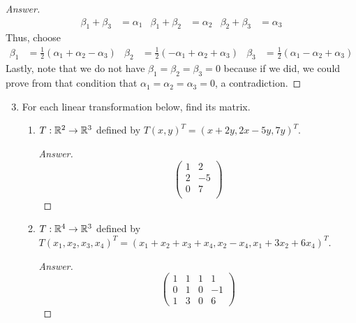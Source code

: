 \documentclass[../psets.tex]{subfiles}
\begin{document}
\begin{enumerate}[label={\textbf{2.\arabic*.}}]
\begin{proof}[Answer]
\begin{align*}
            \beta_1+\beta_3 &= \alpha_1&
            \beta_1+\beta_2 &= \alpha_2&
            \beta_2+\beta_3 &= \alpha_3
        \end{align*}
        Thus, choose
        \begin{align*}
            \beta_1 &= \frac{1}{2}(\alpha_1+\alpha_2-\alpha_3)&
            \beta_2 &= \frac{1}{2}(-\alpha_1+\alpha_2+\alpha_3)&
            \beta_3 &= \frac{1}{2}(\alpha_1-\alpha_2+\alpha_3)
        \end{align*}
        Lastly, note that we do not have $\beta_1=\beta_2=\beta_3=0$ because if we did, we could prove from that condition that $\alpha_1=\alpha_2=\alpha_3=0$, a contradiction.
    \end{proof}
\end{enumerate}

\begin{enumerate}[label={\textbf{3.\arabic*.}}]
    \setcounter{enumi}{2}
    \item For each linear transformation below, find its matrix.
    \begin{enumerate}
        \item $T:\mathbb{R}^2\to\mathbb{R}^3$ defined by $T(x,y)^T=(x+2y,2x-5y,7y)^T$.
        \begin{proof}[Answer]
            \begin{equation*}
                \begin{pmatrix}
                    1 & 2\\
                    2 & -5\\
                    0 & 7\\
                \end{pmatrix}
            \end{equation*}
        \end{proof}
        \item $T:\mathbb{R}^4\to\mathbb{R}^3$ defined by $T(x_1,x_2,x_3,x_4)^T=(x_1+x_2+x_3+x_4,x_2-x_4,x_1+3x_2+6x_4)^T$.
        \begin{proof}[Answer]
            \begin{equation*}
                \begin{pmatrix}
                    1 & 1 & 1 & 1\\
                    0 & 1 & 0 & -1\\
                    1 & 3 & 0 & 6
                \end{pmatrix}
            \end{equation*}
        \end{proof}

\end{enumerate}
\end{enumerate}
\end{document}
